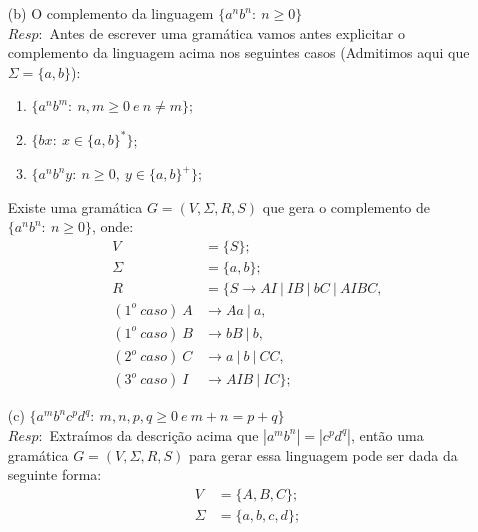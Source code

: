 \documentclass{homework}
\begin{document}
\pagestyle{fancy}

	\begin{itemize}
		\item[(b)] O complemento da linguagem $\{a^n b^n:\ n \geq 0\}$\\
		$Resp:$ Antes de escrever uma gramática vamos antes explicitar o complemento da linguagem acima nos seguintes casos (Admitimos aqui que $\Sigma = \{a,b\}$):
		\begin{enumerate}
			\item $\{a^n b^m:\ n,m \geq 0\ e\ n \neq m\}$;
			\item $\{b x:\ x \in \{a,b\}^*\}$;
			\item $\{a^n b^n y:\ n \geq 0,\ y \in \{a,b\}^+\}$;
		\end{enumerate}		 Existe uma gramática $G = (V, \Sigma, R, S)$ que gera o complemento de $\{a^n b^n:\ n \geq 0\}$, onde: %
		\begin{align*}
			V &= \{S\};\\
			\Sigma &= \{a,b\};\\
			R &= \{S \rightarrow AI\ |\ IB\ |\ bC\ |\ AIBC,\\
			(1^o\ caso)\ A & \rightarrow Aa\ |\ a,\\
			(1^o\ caso)\ B & \rightarrow bB\ |\ b,\\
			(2^o\ caso)\ C & \rightarrow a\ |\ b\ |\ CC,\\
			(3^o\ caso)\ I & \rightarrow AIB\ |\ IC\};
		\end{align*}
		\item[(c)] $\{a^m b^n c^p d^q:\ m,n,p,q \geq 0\ e\ m + n = p + q\}$\\
		$Resp:$ Extraímos da descrição acima que $|a^m b^n| = |c^p d^q|$, então uma gramática $G = (V, \Sigma, R, S)$ para gerar essa linguagem pode ser dada da seguinte forma: %
		\begin{align*}
			V &= \{A, B, C\};\\
			\Sigma &= \{a,b,c,d\};\\

\end{align*}
\end{itemize}
\end{document}
